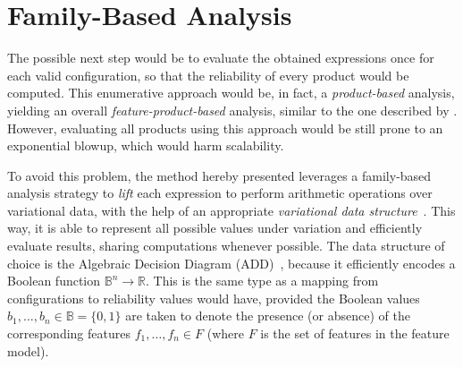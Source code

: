 







\section{Family-Based Analysis \label{sec:familyBasedAnalysis}}

The possible next step would be to evaluate the obtained expressions once for
each valid configuration, so that the reliability of every product would be
computed.  This enumerative approach would be, in fact, a \emph{product-based}
analysis, yielding an overall \emph{feature-product-based} analysis, similar to
the one described by \citet{ghezzi_model-based_2013}.  However, evaluating all
products using this approach would be still prone to an exponential blowup,
which would harm scalability.

To avoid this problem, the method hereby presented leverages a family-based
analysis strategy to \emph{lift} each expression to perform arithmetic
operations over variational data, with the help of an appropriate
\emph{variational data structure}~\cite{walkingshaw_variational_2014}.  This
way, it is able to represent all possible values under variation and efficiently
evaluate results, sharing computations whenever possible.  The data structure of
choice is the Algebraic Decision Diagram (ADD)\footnotemark{}~\cite{Iris1993},
because it efficiently encodes a Boolean function $\mathbb{B}^n \to \mathbb{R}$.
This is the same type as a mapping from configurations to reliability values
would have, provided the Boolean values $b_1, \dotsc, b_n \in
{\mathbb{B}=\{0,1\}}$ are taken to denote the presence (or absence) of the
corresponding features $f_1, \dotsc, f_n \in F$ (where $F$ is the set of
features in the feature model).

